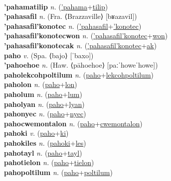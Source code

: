  \label{'pahamatec} \\
\textbf{'pahamatilip} \textit{n.} (\hyperref['pahama]{'pahama}+\hyperref[tilip]{tilip})
 \label{'pahamatilip} \\
\textbf{'pahasafil} \textit{n.} (Fra. ⟨Brazzaville⟩ [bʁazavil])
 \label{'pahasafil} \\
\textbf{'pahasafil'konotec} \textit{n.} (\hyperref['pahasafil]{'pahasafil}+\hyperref['konotec]{'konotec})
 \label{'pahasafil'konotec} \\
\textbf{'pahasafil'konotecwon} \textit{n.} (\hyperref['pahasafil'konotec]{'pahasafil'konotec}+\hyperref[won]{won})
 \label{'pahasafil'konotecwon} \\
\textbf{'pahasafil'konotecak} \textit{n.} (\hyperref['pahasafil'konotec]{'pahasafil'konotec}+\hyperref[ak]{ak})
 \label{'pahasafil'konotecak} \\
\textbf{paho} \textit{v.} (Spa. ⟨bajo⟩ [ˈbaxo])
 \label{paho} \\
\textbf{'pahoehoe} \textit{n.} (Haw. ⟨pāhoehoe⟩ [paːˈhoweˈhowe])
 \label{'pahoehoe} \\
\textbf{paholekcohpoltilum} \textit{n.} (\hyperref[paho]{paho}+\hyperref[lekcohpoltilum]{lekcohpoltilum})
 \label{paholekcohpoltilum} \\
\textbf{paholon} \textit{n.} (\hyperref[paho]{paho}+\hyperref[lon]{lon})
 \label{paholon} \\
\textbf{paholum} \textit{n.} (\hyperref[paho]{paho}+\hyperref[lum]{lum})
 \label{paholum} \\
\textbf{paholyan} \textit{n.} (\hyperref[paho]{paho}+\hyperref[lyan]{lyan})
 \label{paholyan} \\
\textbf{pahonyec} \textit{n.} (\hyperref[paho]{paho}+\hyperref[nyec]{nyec})
 \label{pahonyec} \\
\textbf{pahocwemontalon} \textit{n.} (\hyperref[paho]{paho}+\hyperref[cwemontalon]{cwemontalon})
 \label{pahocwemontalon} \\
\textbf{pahoki} \textit{v.} (\hyperref[paho]{paho}+\hyperref[ki]{ki})
 \label{pahoki} \\
\textbf{pahokiles} \textit{n.} (\hyperref[pahoki]{pahoki}+\hyperref[les]{les})
 \label{pahokiles} \\
\textbf{pahotayl} \textit{n.} (\hyperref[paho]{paho}+\hyperref[tayl]{tayl})
 \label{pahotayl} \\
\textbf{pahotielon} \textit{n.} (\hyperref[paho]{paho}+\hyperref[tielon]{tielon})
 \label{pahotielon} \\
\textbf{pahopoltilum} \textit{n.} (\hyperref[paho]{paho}+\hyperref[poltilum]{poltilum})
